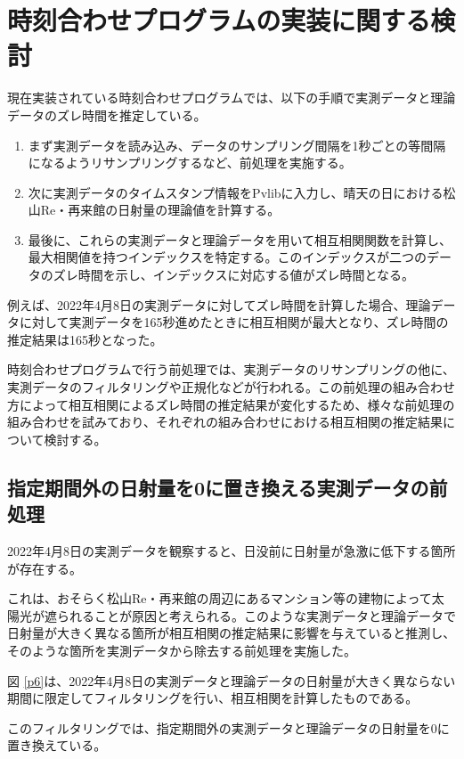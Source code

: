 \documentclass[a4j,12pt,]{jarticle}
\begin{document}
\section{時刻合わせプログラムの実装に関する検討}
現在実装されている時刻合わせプログラムでは、以下の手順で実測データと理論データのズレ時間を推定している。

\begin{enumerate}
\item まず実測データを読み込み、データのサンプリング間隔を1秒ごとの等間隔になるようリサンプリングするなど、前処理を実施する。
\item 次に実測データのタイムスタンプ情報をPvlibに入力し、晴天の日における松山Re・再来館の日射量の理論値を計算する。
\item 最後に、これらの実測データと理論データを用いて相互相関関数を計算し、最大相関値を持つインデックスを特定する。このインデックスが二つのデータのズレ時間を示し、インデックスに対応する値がズレ時間となる。
\end{enumerate}

例えば、2022年4月8日の実測データに対してズレ時間を計算した場合、理論データに対して実測データを165秒進めたときに相互相関が最大となり、ズレ時間の推定結果は165秒となった。

時刻合わせプログラムで行う前処理では、実測データのリサンプリングの他に、実測データのフィルタリングや正規化などが行われる。この前処理の組み合わせ方によって相互相関によるズレ時間の推定結果が変化するため、様々な前処理の組み合わせを試みており、それぞれの組み合わせにおける相互相関の推定結果について検討する。

\subsection{指定期間外の日射量を0に置き換える実測データの前処理}
2022年4月8日の実測データを観察すると、日没前に日射量が急激に低下する箇所が存在する。

これは、おそらく松山Re・再来館の周辺にあるマンション等の建物によって太陽光が遮られることが原因と考えられる。このような実測データと理論データで日射量が大きく異なる箇所が相互相関の推定結果に影響を与えていると推測し、そのような箇所を実測データから除去する前処理を実施した。

図 \ref{p6}は、2022年4月8日の実測データと理論データの日射量が大きく異ならない期間に限定してフィルタリングを行い、相互相関を計算したものである。

このフィルタリングでは、指定期間外の実測データと理論データの日射量を0に置き換えている。
\end{document}
